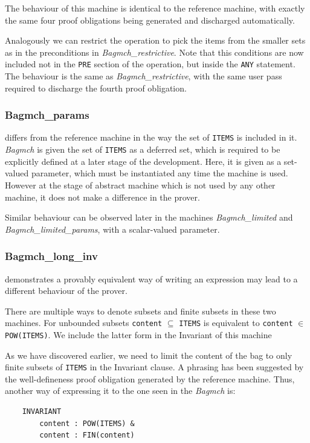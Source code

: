 \documentclass[12pt,journal,duplex]{IEEEtran}
\begin{document}
	The behaviour of this machine is identical to the reference machine, with exactly the same four proof obligations being generated and discharged automatically.

	Analogously we can restrict the operation to pick the items from the smaller sets as in the preconditions in \emph{Bagmch\_restrictive}. Note that this conditions are now included not in the \texttt{PRE} section of the operation, but inside the \texttt{ANY} statement. The behaviour is the same as \emph{Bagmch\_restrictive}, with the same user pass required to discharge the fourth proof obligation.

	\subsubsection{Bagmch\_params} differs from the reference machine in the way the set of \texttt{ITEMS} is included in it. \emph{Bagmch} is given the set of \texttt{ITEMS} as a deferred set, which is required to be explicitly defined at a later stage of the development. Here, it is given as a set-valued parameter, which must be instantiated any time the machine is used.\cite{b-method} However at the stage of abstract machine which is not used by any other machine, it does not make a difference in the prover.

	Similar behaviour can be observed later in the machines \emph{Bagmch\_limited} and \emph{Bagmch\_limited\_params}, with a scalar-valued parameter.

	\subsubsection{Bagmch\_long\_inv} demonstrates a provably equivalent way of writing an expression may lead to a different behaviour of the prover.

	There are multiple ways to denote subsets and finite subsets in these two machines. For unbounded subsets \texttt{content} $\subseteq$ \texttt{ITEMS} is equivalent to \texttt{content} $\in$ \texttt{POW(ITEMS)}. We include the latter form in the Invariant of this machine

	As we have discovered earlier, we need to limit the content of the bag to only finite subsets of \texttt{ITEMS} in the Invariant clause. A phrasing has been suggested by the well-defineness proof obligation generated by the reference machine. Thus, another way of expressing it to the one seen in the \emph{Bagmch} is:

	\begin{lstlisting}
	INVARIANT
	    content : POW(ITEMS) &
		content : FIN(content)
	\end{lstlisting}
\end{document}
